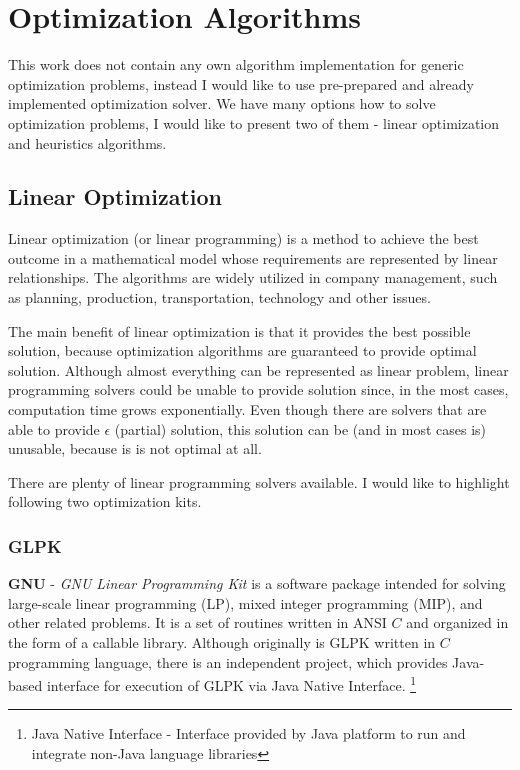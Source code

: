 
\section{Optimization Algorithms}\label{sec:optimization-algorithms}

This work does not contain any own algorithm implementation for generic optimization problems,
instead I would like to use pre-prepared and already implemented optimization solver.
We have many options how to solve optimization problems, I would like to present two of them
- linear optimization and heuristics algorithms.

\subsection{Linear Optimization}\label{subsec:linear-optimization}
Linear optimization (or linear programming) is a method to achieve the best outcome in a mathematical model
whose requirements are represented by linear relationships.
The algorithms are widely utilized in company management, such as planning, production, transportation, technology and other issues.

The main benefit of linear optimization is that it provides the best possible solution,
because optimization algorithms are guaranteed to provide optimal solution.
Although almost everything can be represented as linear problem,
linear programming solvers could be unable to provide solution since, in the most cases, computation time grows exponentially.
Even though there are solvers that are able to provide $\epsilon$ (partial) solution,
this solution can be (and in most cases is) unusable, because is is not optimal at all.

\medskip
\noindent There are plenty of linear programming solvers available.
I would like to highlight following two optimization kits.

\subsubsection{GLPK}\label{subsubsec:glpk}
\textbf{GNU} - \textit{GNU Linear Programming Kit} is a software package intended for solving large-scale linear programming (LP),
mixed integer programming (MIP), and other related problems.
It is a set of routines written in ANSI $C$ and organized in the form of a callable library\cite{web:gnuGlpk}.
Although originally is GLPK written in $C$ programming language,
there is an independent project,
which provides Java-based interface for execution of GLPK via Java Native Interface.
\footnote{Java Native Interface - Interface provided by Java platform to run and integrate non-Java language libraries}

